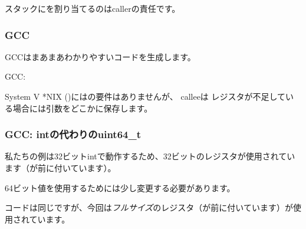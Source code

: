 スタックにを割り当てるのは\gls{caller}の責任です。

\subsubsection{GCC}

\Optimizing GCCはまあまあわかりやすいコードを生成します。



\NonOptimizing GCC:




System V *NIX (\SysVABI)にはの要件はありませんが、 \gls{callee}は
レジスタが不足している場合には引数をどこかに保存します。

\subsubsection{GCC: intの代わりのuint64\_t}

私たちの例は32ビットintで動作するため、32ビットのレジスタが使用されています（が前に付いています）。 

64ビット値を使用するためには少し変更する必要があります。





コードは同じですが、今回は\emph{フルサイズ}のレジスタ（が前に付いています）が使用されています。
